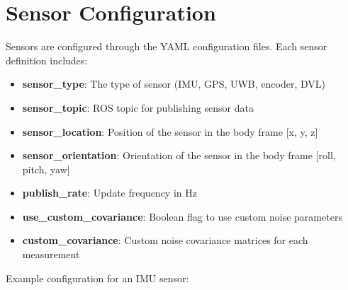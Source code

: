 \documentclass[
  letterpaper,
  DIV=11,
  numbers=noendperiod]{scrreprt}
\providecommand{\tightlist}{%
  \setlength{\itemsep}{0pt}\setlength{\parskip}{0pt}}\usepackage{longtable,booktabs,array}
\begin{document}
\section*{Sensor Configuration}\label{sensor-configuration}


Sensors are configured through the YAML configuration files. Each sensor
definition includes:

\begin{itemize}
\tightlist
\item
  \textbf{sensor\_type}: The type of sensor (IMU, GPS, UWB, encoder,
  DVL)
\item
  \textbf{sensor\_topic}: ROS topic for publishing sensor data
\item
  \textbf{sensor\_location}: Position of the sensor in the body frame
  {[}x, y, z{]}
\item
  \textbf{sensor\_orientation}: Orientation of the sensor in the body
  frame {[}roll, pitch, yaw{]}
\item
  \textbf{publish\_rate}: Update frequency in Hz
\item
  \textbf{use\_custom\_covariance}: Boolean flag to use custom noise
  parameters
\item
  \textbf{custom\_covariance}: Custom noise covariance matrices for each
  measurement
\end{itemize}

Example configuration for an IMU sensor:
\end{document}
